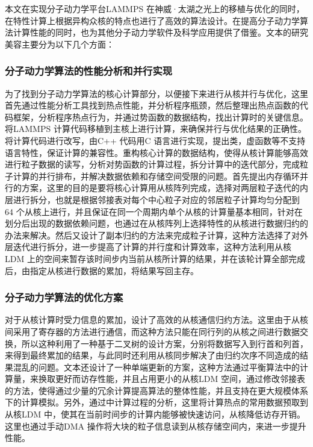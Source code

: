 本文在实现分子动力学平台LAMMPS 在神威·太湖之光上的移植与优化的同时，在特性计算上根据异构众核的特点也进行了高效的算法设计。在提高分子动力学算法计算性能的同时，也为其他分子动力学软件及科学应用提供了借鉴。文本的研究美容主要分为以下几个方面：

\subsubsection{分子动力学算法的性能分析和并行实现}
为了找到分子动力学算法的核心计算部分，以便接下来进行从核并行与优化，这里首先通过性能分析工具找到热点性能，并分析程序瓶颈，然后整理出热点函数的代码框架，分析程序热点行为，并通过势函数的数据结构，找出计算时的关键信息。将LAMMPS 计算代码移植到主核上进行计算，来确保并行与优化结果的正确性。将计算代码进行改写，由C++ 代码用C 语言进行实现，提出类，虚函数等不支持语言特性，保证计算的兼容性。重构核心计算的数据结构，使得从核计算能够高效进行粒子数据的读写，分析对势函数的计算过程，拆分计算中的迭代部分，完成粒子计算的并行排布，并解决数据依赖和存储空间受限的问题。首先提出内存循环并行的方案，这里的目的是要将核心计算用从核阵列完成，选择对两层粒子迭代的内层进行拆分，也就是根据邻接表对每个中心粒子对应的邻居粒子计算均匀分配到 64 个从核上进行，并且保证在同一个周期内单个从核的计算量基本相同，针对在划分后出现的数据依赖问题，也通过在从核阵列上选择特性的从核进行数据归约的办法来解决。然后又设计了副本归约的方法来完成粒子计算，这种方法选择了对外层迭代进行拆分，进一步提高了计算的并行度和计算效率，这种方法利用从核LDM 上的空间来暂存该时间步内当前从核所计算的结果，并在该轮计算全部完成后，由指定从核进行数据的累加，将结果写回主存。

\subsubsection{分子动力学算法的优化方案}
对于从核计算时受力信息的累加，设计了高效的从核通信归约方法。这里由于从核间采用了寄存器的方法进行通信，而这种方法只能在同行列的从核之间进行数据交换，所以这种利用了一种基于二叉树的设计方案，分别将数据写入到行首和列首，来得到最终累加的结果，与此同时还利用从核同步解决了由归约次序不同造成的结果混乱的问题。文本还设计了一种单端更新的方案，这种方法通过平衡算法中的计算量，来换取更好而访存性能，并且占用更小的从核LDM 空间，通过修改邻接表的方法，使得通过少量的冗余计算提高算法的整体性能，并且支持在更大规模体系下的计算模拟。另外，通过中计算过程的分析，这里将计算热点的常用数据预取到从核LDM 中，使其在当前时间步的计算内能够被快速访问，从核降低访存开销。这里也通过手动DMA 操作将大块的粒子信息读到从核存储空间内，来进一步提升性能。

